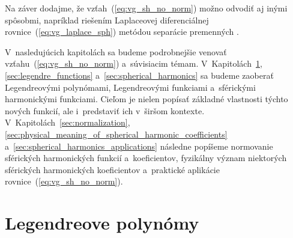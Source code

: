 \documentclass[a4paper, 12pt]{book}
\begin{document}
Na záver dodajme, že vzťah~(\ref{eq:vg_sh_no_norm}) možno odvodiť aj inými 
spôsobmi, napríklad riešením Laplaceovej diferenciálnej 
rovnice~(\ref{eq:vg_laplace_sph}) metódou separácie premenných 
\parencite{MoritzPhysicalGeodesy,Janak2006}.

V~nasledujúcich kapitolách sa budeme podrobnejšie venovať
vzťahu~(\ref{eq:vg_sh_no_norm}) a~súvisiacim témam.
V~Kapitolách~\ref{sec:legendre_polynomials}, \ref{sec:legendre_functions}
a~\ref{sec:spherical_harmonics} sa budeme zaoberať Legendreovými polynómami,
Legendreovými funkciami a~sférickými harmonickými funkciami.  Cieľom je nielen
popísať základné vlastnosti týchto nových funkcií, ale i~predstaviť ich
v~širšom kontexte.  V~Kapitolách~\ref{sec:normalization},
\ref{sec:physical_meaning_of_spherical_harmonic_coefficients}
a~\ref{sec:spherical_harmonics_applications} následne popíšeme normovanie
sférických harmonických funkcií a~koeficientov, fyzikálny význam niektorých
sférických harmonických koeficientov a~praktické aplikácie
rovnice~(\ref{eq:vg_sh_no_norm}).






\section{Legendreove polynómy}
\label{sec:legendre_polynomials}
\end{document}
